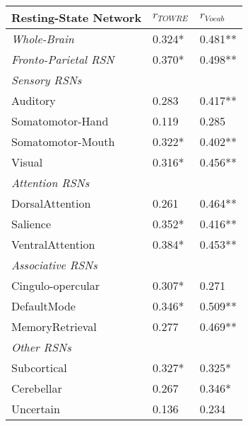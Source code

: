 \begin{tabular}{L{5cm}L{2cm}L{2cm}}
\toprule
Resting-State Network & $r_{TOWRE}$ & $r_{Vocab}$ \\
\midrule
\textit{Whole-Brain}           &  0.324* & 0.481** \\
\textit{Fronto-Parietal RSN}   &        0.370* &       0.498** \\
\textit{Sensory RSNs} & & \\
\hspace{3pt}Auditory          &        0.283 &       0.417**  \\
\hspace{3pt}Somatomotor-Hand  &        0.119 &       0.285    \\
\hspace{3pt}Somatomotor-Mouth &        0.322* &       0.402** \\
\hspace{3pt}Visual            &        0.316* &       0.456** \\
\textit{Attention RSNs} & & \\
\hspace{3pt}DorsalAttention   &        0.261 &       0.464**  \\
\hspace{3pt}Salience          &        0.352* &       0.416** \\
\hspace{3pt}VentralAttention  &        0.384* &       0.453** \\
\textit{Associative RSNs} & & \\
\hspace{3pt}Cingulo-opercular &        0.307* &       0.271   \\
\hspace{3pt}DefaultMode       &        0.346* &       0.509** \\
\hspace{3pt}MemoryRetrieval   &        0.277 &       0.469**  \\
\textit{Other RSNs} & & \\
\hspace{3pt}Subcortical       &        0.327* &       0.325*  \\
\hspace{3pt}Cerebellar        &        0.267 &       0.346*   \\
\hspace{3pt}Uncertain         &        0.136 &       0.234    \\
\bottomrule
\end{tabular}